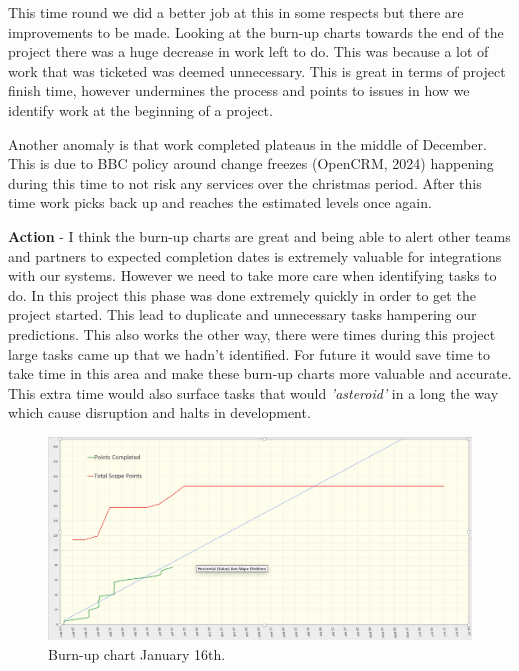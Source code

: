  This time round we did a better job at this in some respects but there are improvements to be made. Looking at the burn-up charts towards the end of the 
  project there was a huge decrease in work left to do. This was because a lot of work that was ticketed was deemed unnecessary. This is great in terms of 
  project finish time, however undermines the process and points to issues in how we identify work at the beginning of a project.

  Another anomaly is that work completed plateaus in the middle of December. This is due to BBC policy around change freezes (OpenCRM, 2024) happening 
  during this time to not risk any services over the christmas period. After this time work picks back up and reaches the estimated levels once again.

  \vspace{0.2cm}
  \textbf{Action} - I think the burn-up charts are great and being able to alert other teams and partners to expected completion dates is extremely
  valuable for integrations with our systems. However we need to take more care when identifying tasks to do. In this project this phase was done 
  extremely quickly in order to get the project started. This lead to  duplicate and  unnecessary tasks hampering our predictions. This also works the other way, 
  there were times during this project large tasks came up that we hadn't identified. For future it would save time to take time in this area and make these 
  burn-up charts more valuable and accurate. This extra time would also surface tasks that would \textit{'asteroid'} in a long the way which cause disruption 
  and halts in development.

  \begin{figure}[H]
    \centering
    \includegraphics[width=12cm]{assets/outputs/burnups/01-16.png}
    \caption{Burn-up chart January 16th.}
    \label{fig:burnup1}
  \end{figure}

